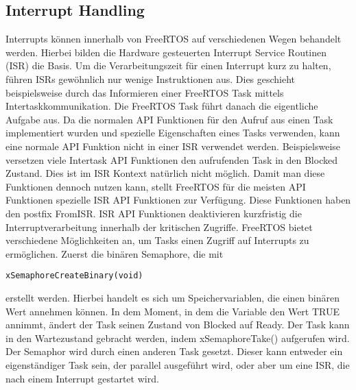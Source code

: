 \subsection{Interrupt Handling}
\label{sec:Interrupt}
Interrupts können innerhalb von FreeRTOS auf verschiedenen Wegen behandelt werden. Hierbei bilden die Hardware gesteuerten Interrupt Service Routinen (ISR) die Basis. Um die Verarbeitungszeit für einen Interrupt kurz zu halten, führen ISRs gewöhnlich nur wenige Instruktionen aus. Dies geschieht beispielsweise durch das Informieren einer FreeRTOS Task mittels Intertaskkommunikation. Die FreeRTOS Task führt danach die eigentliche Aufgabe aus. Da die normalen API Funktionen für den Aufruf aus einen Task implementiert wurden und spezielle Eigenschaften eines Tasks verwenden, kann eine normale API Funktion nicht in einer ISR verwendet werden. Beispielsweise versetzen viele Intertask API Funktionen den aufrufenden Task in den Blocked Zustand. Dies ist im ISR Kontext natürlich nicht möglich. Damit man diese Funktionen dennoch nutzen kann, stellt FreeRTOS für die meisten API Funktionen spezielle ISR API Funktionen zur Verfügung. Diese Funktionen haben den postfix FromISR. ISR API Funktionen deaktivieren kurzfristig die Interruptverarbeitung innerhalb der kritischen Zugriffe.
FreeRTOS bietet verschiedene Mög\-lich\-keit\-en an, um Tasks einen Zugriff auf Interrupts zu ermöglichen.\newline
Zuerst die binären Semaphore, die mit
\begin{lstlisting}[numbers = none]
xSemaphoreCreateBinary(void) 
\end{lstlisting}
erstellt werden. Hierbei handelt es sich um Speichervariablen, die einen binären Wert annehmen können. In dem Moment, in dem die Variable den Wert TRUE annimmt, ändert der Task seinen Zustand von Blocked auf Ready. Der Task kann in den Wartezustand gebracht werden, indem xSemaphoreTake() aufgerufen wird. 
Der Semaphor wird durch einen anderen Task gesetzt. Dieser kann entweder ein eigenständiger Task sein, der parallel ausgeführt wird, oder aber um eine ISR, die nach einem Interrupt gestartet wird.
